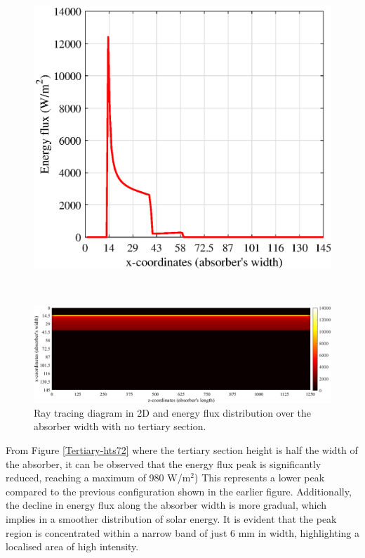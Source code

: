 \begin{figure}[ht!]
\begin{minipage}{0.48\columnwidth}
	\end{minipage}
	\begin{minipage}{0.48\columnwidth}
		\includegraphics[scale=0.45]{figs/Energy2D-hts0.eps}
	\end{minipage}
	\\[3mm]
	\begin{minipage}{1.0\columnwidth}
		\includegraphics[scale=0.40]{figs/Energy3D-hts0.png}
	\end{minipage}
	
	\caption{Ray tracing diagram in 2D and energy flux distribution over the absorber width with no tertiary section.}
	\label{Tertiary-hts0}
\end{figure}

From Figure \ref{Tertiary-hts72} where the tertiary section height is half the width of the absorber, it can be observed that the energy flux peak is significantly reduced, reaching a maximum of 980 W/m$^2$) This represents a lower peak compared to the previous configuration shown in the earlier figure. Additionally, the decline in energy flux along the absorber width is more gradual, which implies in a smoother distribution of solar energy. It is evident that the peak region is concentrated within a narrow band of just 6 mm in width, highlighting a localised area of high intensity.

